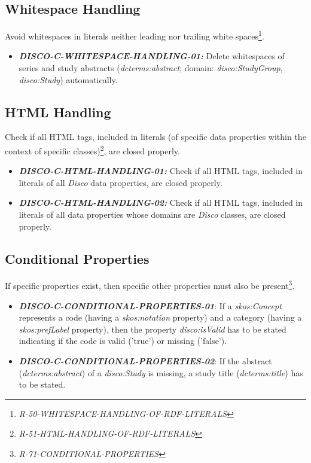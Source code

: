 \documentclass{llncs}
\begin{document}
\subsection{Whitespace Handling}

Avoid whitespaces in literals neither leading nor trailing white spaces\footnote{\emph{R-50-WHITESPACE-HANDLING-OF-RDF-LITERALS}}.

\begin{itemize}
	\item \textbf{{\em DISCO-C-WHITESPACE-HANDLING-01:}} Delete whitespaces of series and study abstracts (\emph{dcterms:abstract}; domain: \emph{disco:StudyGroup}, \emph{disco:Study}) automatically.
\end{itemize}

\subsection{HTML Handling}

Check if all HTML tags, included in literals (of specific data properties within the context of specific classes)\footnote{\emph{R-51-HTML-HANDLING-OF-RDF-LITERALS}}, are closed properly.

\begin{itemize}
	\item \textbf{{\em DISCO-C-HTML-HANDLING-01:}} Check if all HTML tags, included in literals of all \emph{Disco} data properties, are closed properly.
	\item \textbf{{\em DISCO-C-HTML-HANDLING-02:}} Check if all HTML tags, included in literals of all data properties whose domains are \emph{Disco} classes, are closed properly.
\end{itemize}


\subsection{Conditional Properties}

If specific properties exist, then specific other properties must also be present\footnote{{\em R-71-CONDITIONAL-PROPERTIES}}.

\begin{itemize}
	\item \textbf{{\em DISCO-C-CONDITIONAL-PROPERTIES-01}}:
  If a {\em skos:Concept} represents a code (having a {\em skos:notation} property) and a category (having a {\em skos:prefLabel} property), 
then the property {\em disco:isValid} has to be stated indicating if the code is valid ('true') or missing ('false').
	\item \textbf{{\em DISCO-C-CONDITIONAL-PROPERTIES-02}}:
	If the abstract (\emph{dcterms:abstract}) of a \emph{disco:Study} is missing, a study title (\emph{dcterms:title}) has to be stated.
\end{itemize}
\end{document}
